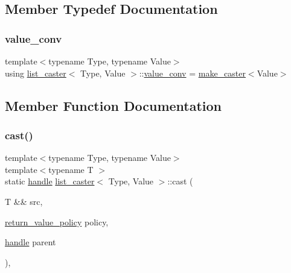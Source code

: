 \subsection{Member Typedef Documentation}
\mbox{\label{structlist__caster_ac967cd6db186bb9053a3309967afd769}} 
\subsubsection{\texorpdfstring{value\_conv}{value\_conv}}
{\footnotesize\ttfamily template$<$typename Type, typename Value$>$ \\
using \mbox{\hyperlink{structlist__caster}{list\+\_\+caster}}$<$ Type, Value $>$\+::\mbox{\hyperlink{structlist__caster_ac967cd6db186bb9053a3309967afd769}{value\+\_\+conv}} =  \mbox{\hyperlink{cast_8h_ab32b52411a6b07420516d79074815713}{make\+\_\+caster}}$<$Value$>$}



\subsection{Member Function Documentation}
\mbox{\label{structlist__caster_add7c216960ed11015507b9c4356d088d}} 
\subsubsection{\texorpdfstring{cast()}{cast()}}
{\footnotesize\ttfamily template$<$typename Type, typename Value$>$ \\
template$<$typename T $>$ \\
static \mbox{\hyperlink{classhandle}{handle}} \mbox{\hyperlink{structlist__caster}{list\+\_\+caster}}$<$ Type, Value $>$\+::cast (\begin{DoxyParamCaption}\item[{T \&\&}]{src,  }\item[{\mbox{\hyperlink{detail_2common_8h_adde72ab1fb0dd4b48a5232c349a53841}{return\+\_\+value\+\_\+policy}}}]{policy,  }\item[{\mbox{\hyperlink{classhandle}{handle}}}]{parent }\end{DoxyParamCaption})\hspace{0.3cm}{\ttfamily [inline]}, {\ttfamily [static]}}

